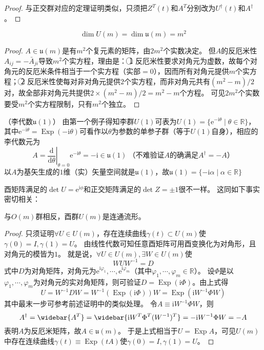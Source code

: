 \begin{proof}
    与正交群对应的定理证明类似，只须把$Z^T(t)$和$A^T$分别改为$U^\dagger(t)$和$A^\dagger$。
\end{proof}

\begin{theorem}
    $$\dim U(m) = \dim \mathfrak{u}(m) = m^2$$
\end{theorem}

\begin{proof}
    $A \in \mathfrak{u}(m)$是有$m^2$个复元素的矩阵，由$2m^2$个实数决定。
    但$A$的反厄米性$A_{ij} = -\bar A_{ji}$导致$m^2$个实方程，理由是：
    \textcircled{1} 反厄米性要求对角元为虚数，故每个对角元的反厄米条件相当于一个实方程（实部$= 0$），因而所有对角元提供$m$个实方程；
    \textcircled{2} 反厄米性使每对非对角元提供$2$个实方程，而非对角元共有$(m^2 - m) / 2$对，故全部非对角元共提供$2 \times (m^2 - m) / 2 = m^2 - m$个方程。
    可见$2m^2$个实数要受$m^2$个实方程限制，只有$m^2$个独立。
\end{proof}

\begin{example}
    （李代数$\mathfrak{u}(1)$）
    由第一个例子得知李群$U(1)$可表为$U(1) = \{\mathrm{e}^{-\mathrm{i}\theta} \mid \theta \in \mathbb{R}\}$，其中$\mathrm{e}^{-\mathrm{i}\theta} = \operatorname{Exp}(-\mathrm{i}\theta)$可看作以$\theta$为参数的单参子群（等于$U(1)$自身），相应的李代数元为
    $$A = \left.\frac{\mathrm{d}}{\mathrm{d}\theta}\right|_{\theta = 0}\mathrm{e}^{-\mathrm{i}\theta} = -\mathrm{i} \in \mathfrak{u}(1) ~ \text{（不难验证$A$的确满足$A^\dagger = -A$）}$$
    以$A$为基矢生成的$1$维（实）矢量空间就是$\mathfrak{u}(1)$，故$\mathfrak{u}(1) = \{-\mathrm{i}\alpha \mid \alpha \in \mathbb{R}\}$
\end{example}

酉矩阵满足的$\det U = \mathrm{e}^{\mathrm{i}\phi}$和正交矩阵满足的$\det Z = \pm 1$很不一样。
这同如下事实密切相关：

\begin{theorem}
    与$O(m)$群相反，酉群$U(m)$是连通流形。
\end{theorem}

\begin{proof}
    只须证明$\forall U \in U(m)$，存在连续曲线$\gamma(t) \subset U(m)$使$\gamma(0) = I, \gamma(1) = U$。
    由线性代数可知任意酉矩阵可用酉变换化为对角形，且对角元的模皆为$1$。
    就是说，$\forall U \in U(m), \exists W \in U(m)$使
    $$WUW^{-1} = D$$
    式中$D$为对角矩阵，对角元为$\mathrm{e}^{\mathrm{i}\varphi_1}, \cdots, \mathrm{e}^{\mathrm{i}\varphi_m}$（其中$\varphi_1, \cdots, \varphi_m \in \mathbb{R}$）。
    设$\Phi$是以$\varphi_1, \cdots, \varphi_m$为对角元的实对角矩阵，则可验证$D = \operatorname{Exp}(\mathrm{i}\Phi)$。由上式得
    $$U = W^{-1}DW = W^{-1}(\operatorname{Exp}(\mathrm{i}\Phi))W = \operatorname{Exp}(\mathrm{i}W^{-1}\Phi W)$$
    其中最末一步可参考前述证明中的类似处理。
    令$A \equiv \mathrm{i}W^{-1}\Phi W$，则
    $$A^\dagger = \widebar{A^T} = \widebar{\mathrm{i}W^T\Phi^T(W^{-1})^T} = -\mathrm{i}W^{-1}\Phi W = -A$$
    表明$A$为反厄米矩阵，故$A \in \mathfrak{u}(m)$。
    于是上式相当于$U = \operatorname{Exp}A$，可见$U(m)$中存在连续曲线$\gamma(t) \equiv \operatorname{Exp}(tA)$使$\gamma(0) = I, \gamma(1) = U$。
\end{proof}

